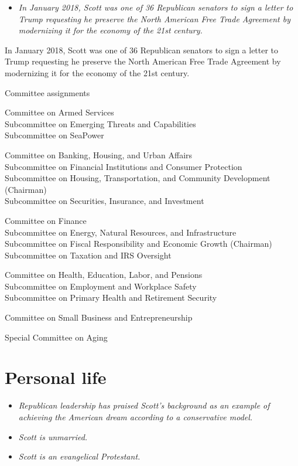 \begin{itemize}
\item
  \emph{In January 2018, Scott was one of 36 Republican senators to sign
  a letter to Trump requesting he preserve the North American Free Trade
  Agreement by modernizing it for the economy of the 21st century.}
\end{itemize}

In January 2018, Scott was one of 36 Republican senators to sign a
letter to Trump requesting he preserve the North American Free Trade
Agreement by modernizing it for the economy of the 21st century.

Committee assignments

Committee on Armed Services\\
Subcommittee on Emerging Threats and Capabilities\\
Subcommittee on SeaPower

Committee on Banking, Housing, and Urban Affairs\\
Subcommittee on Financial Institutions and Consumer Protection\\
Subcommittee on Housing, Transportation, and Community Development
(Chairman)\\
Subcommittee on Securities, Insurance, and Investment

Committee on Finance\\
Subcommittee on Energy, Natural Resources, and Infrastructure\\
Subcommittee on Fiscal Responsibility and Economic Growth (Chairman)\\
Subcommittee on Taxation and IRS Oversight

Committee on Health, Education, Labor, and Pensions\\
Subcommittee on Employment and Workplace Safety\\
Subcommittee on Primary Health and Retirement Security

Committee on Small Business and Entrepreneurship

Special Committee on Aging

\section{Personal life}\label{personal-life}

\begin{itemize}
\item
  \emph{Republican leadership has praised Scott's background as an
  example of achieving the American dream according to a conservative
  model.}
\item
  \emph{Scott is unmarried.}
\item
  \emph{Scott is an evangelical Protestant.}
\end{itemize}

